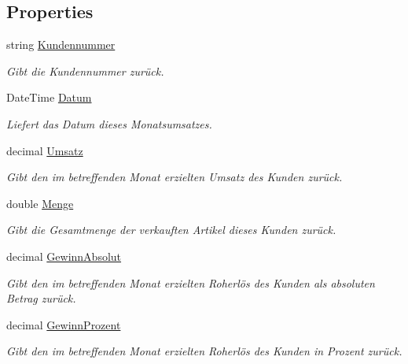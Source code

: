 \subsection*{Properties}
\begin{DoxyCompactItemize}
\item 
string \hyperlink{class_products_1_1_model_1_1_entities_1_1_kunden_monatsumsatz_a709e181ba68b46c6323c8773b4fbdecf}{Kundennummer}
\begin{DoxyCompactList}\small\item\em Gibt die Kundennummer zurück. \end{DoxyCompactList}\item 
Date\+Time \hyperlink{class_products_1_1_model_1_1_entities_1_1_kunden_monatsumsatz_a62f9f7a93b488b77ab61b8600fbd73fe}{Datum}
\begin{DoxyCompactList}\small\item\em Liefert das Datum dieses Monatsumsatzes. \end{DoxyCompactList}\item 
decimal \hyperlink{class_products_1_1_model_1_1_entities_1_1_kunden_monatsumsatz_aebeefe2e43b71caad1c8192b3c32b754}{Umsatz}
\begin{DoxyCompactList}\small\item\em Gibt den im betreffenden Monat erzielten Umsatz des Kunden zurück. \end{DoxyCompactList}\item 
double \hyperlink{class_products_1_1_model_1_1_entities_1_1_kunden_monatsumsatz_aa2c96197f3801f13530d68317b86022e}{Menge}
\begin{DoxyCompactList}\small\item\em Gibt die Gesamtmenge der verkauften Artikel dieses Kunden zurück. \end{DoxyCompactList}\item 
decimal \hyperlink{class_products_1_1_model_1_1_entities_1_1_kunden_monatsumsatz_a0a89f43b9804e7d481cc3babc499646b}{Gewinn\+Absolut}
\begin{DoxyCompactList}\small\item\em Gibt den im betreffenden Monat erzielten Roherlös des Kunden als absoluten Betrag zurück. \end{DoxyCompactList}\item 
decimal \hyperlink{class_products_1_1_model_1_1_entities_1_1_kunden_monatsumsatz_af335a6612b0ccab5dcfe5a6998b87d1c}{Gewinn\+Prozent}
\begin{DoxyCompactList}\small\item\em Gibt den im betreffenden Monat erzielten Roherlös des Kunden in Prozent zurück. \end{DoxyCompactList}\end{DoxyCompactItemize}


